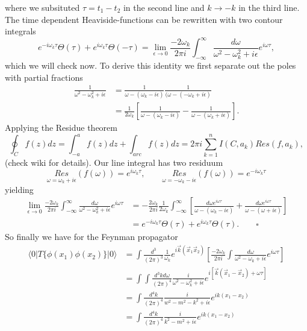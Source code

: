 where we subsituted $\tau = t_1 - t_2$ in the second line and $k \to -k$ in the third line.
The time dependent Heaviside-functions can be rewritten with two contour integrals
\begin{equation}
	e^{-i \omega_k \tau} \Theta(\tau) + e^{i \omega_k \tau} \Theta(- \tau) = \lim_{\epsilon \to 0} \frac{- 2 \omega_k}{2\pi i} \int_{-\infty}^{\infty} \frac{d \omega}{\omega^2 - \omega_k^2 + i \epsilon} e^{i \omega \tau},
\end{equation}
which we will check now.
To derive this identity we first separate out the poles with partial fractions
\begin{align}
	\frac{1}{\omega^2 - \omega_k^2 + i\epsilon} &= \frac{1}{\omega - (\omega_k - i\epsilon)} \frac{1}{(\omega - (-\omega_k + i\epsilon)} \\
	&= \frac{1}{2 \omega_k}  \left [\frac{1}{\omega - (\omega_k - i\epsilon)} - \frac{1}{\omega - (\omega_k + i\epsilon)}  \right ].
\end{align}
Applying the Residue theorem
\begin{equation}
	\oint_C f(z) dz = \int_{-a}^{a} f(z) dz  + \int_{arc} f(z) dz = 2 \pi i \sum_{k=1}^n I(C, a_k) Res(f, a_k),
\end{equation}
(check wiki for details). Our line integral has two residuum
\begin{equation}
	\underset{\omega = \omega_k + i\epsilon}{Res} (f(\omega)) = e^{i \omega_k \tau}, \qquad \underset{\omega = -\omega_k - i\epsilon}{Res} (f(\omega)) =   e^{-i \omega_k \tau}
\end{equation}
yielding
\begin{align}
	\lim_{\epsilon \to 0} \frac{- 2 \omega_k}{2\pi i} \int_{-\infty}^{\infty} \frac{d \omega}{\omega^2 - \omega_k^2 + i \epsilon} e^{i \omega \tau} &= - \frac{2 \omega_k}{2 \pi i} \frac{1}{2 \omega_k} \int_{-\infty}^{\infty} \left[ \frac{d\omega e^{i\omega \tau}}{\omega - (\omega_k - i\epsilon)} + \frac{d \omega e^{i\omega\tau}}{\omega - (\omega + i\epsilon)} \right] \\
	&=  e^{-i\omega_k \tau} \Theta(\tau) + e^{i \omega_k \tau} \Theta(\tau). \qquad \square
\end{align}
So finally we have for the Feynman propagator
\begin{align}
	\langle 0 | T \{ \phi(x_1) \phi(x_2) \} | 0 \rangle &= \int \frac{d^3}{(2\pi)^3} \frac{1}{\omega_k} e^{i \vec k(\vec x_1 \vec x_2)} \left[ \frac{-2 \omega_k}{2 \pi i} \int \frac{d\omega}{\omega^2 - \omega_k + i\epsilon} e^{i\omega \tau} \right] \\
	&= \int\int \frac{d^3k d\omega}{(2 \pi)^4} \frac{i}{\omega^2 - \omega_k^2 + i\epsilon} e^{i [\vec k (\vec x_1 - \vec x_2) + \omega \tau]} \\
	&= \int \frac{d^4 k}{(2\pi)^4}\frac{i}{w^2 - m^2 - k^2 + i\epsilon} e^{ik(x_1 - x_2)} \\
	&= \int \frac{d^4 k}{(2\pi)^4} \frac{i}{k^2 - m^2 + i\epsilon} e^{ik (x_1 - x_2)}
\end{align}

